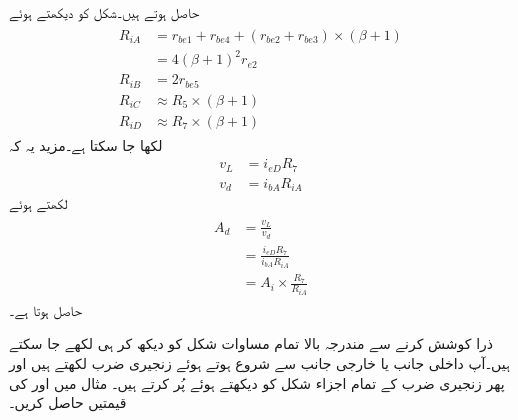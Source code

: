 حاصل ہوتے ہیں۔شکل کو دیکھتے ہوئے
\begin{gather}
\begin{aligned}\label{مساوات_تفرقی_ڈارلنگٹن_داخلی_مزاحمتیں}
R_{iA}& =r_{be1}+r_{be4}+\left(r_{be2} +r_{be3}\right) \times \left(\beta +1 \right)\\
&=4 \left(\beta+1 \right)^2 r_{e2}\\
R_{iB}&=2 r_{be5}\\
R_{iC}& \approx R_5 \times \left(\beta+1 \right )\\
R_{iD}& \approx R_7 \times \left(\beta+1 \right) 
\end{aligned}
\end{gather}
لکھا جا سکتا ہے۔مزید یہ کہ
\begin{align*}
v_L&=i_{eD} R_7\\
v_d&=i_{bA} R_{iA}
\end{align*}
لکھتے ہوئے
\begin{gather}
\begin{aligned}\label{مساوات_تفرقی_ڈارلنگٹن_افزائش_برقی_رو_کا_افزائش_رو_سے_حصول}
A_d&=\frac{v_L}{v_d}\\
&=\frac{i_{eD} R_7}{i_{bA} R_{iA}}\\
&=A_i \times \frac{R_7}{R_{iA}}
\end{aligned}
\end{gather}
حاصل ہوتا ہے۔

ذرا کوشش کرنے سے مندرجہ بالا تمام مساوات شکل  کو دیکھ کر ہی لکھے جا سکتے ہیں۔آپ داخلی جانب یا خارجی جانب  سے شروع ہوتے ہوئے زنجیری ضرب لکھتے ہیں اور پھر زنجیری ضرب کے تمام اجزاء شکل کو دیکھتے ہوئے پُر کرتے ہیں۔
مثال  میں  اور  کی قیمتیں حاصل کریں۔

